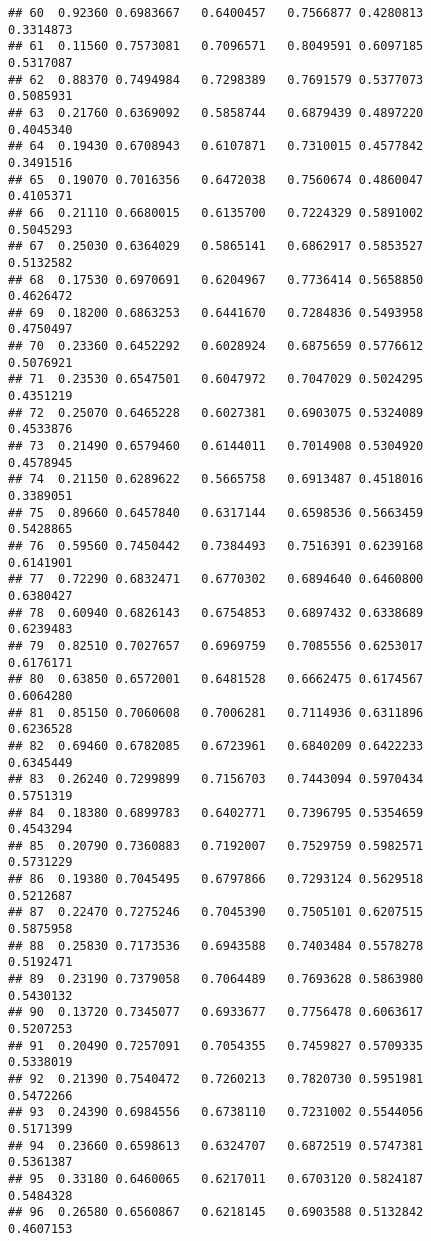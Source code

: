 \documentclass[]{article}
\begin{document}
\begin{verbatim}
## 60  0.92360 0.6983667   0.6400457   0.7566877 0.4280813    0.3314873
## 61  0.11560 0.7573081   0.7096571   0.8049591 0.6097185    0.5317087
## 62  0.88370 0.7494984   0.7298389   0.7691579 0.5377073    0.5085931
## 63  0.21760 0.6369092   0.5858744   0.6879439 0.4897220    0.4045340
## 64  0.19430 0.6708943   0.6107871   0.7310015 0.4577842    0.3491516
## 65  0.19070 0.7016356   0.6472038   0.7560674 0.4860047    0.4105371
## 66  0.21110 0.6680015   0.6135700   0.7224329 0.5891002    0.5045293
## 67  0.25030 0.6364029   0.5865141   0.6862917 0.5853527    0.5132582
## 68  0.17530 0.6970691   0.6204967   0.7736414 0.5658850    0.4626472
## 69  0.18200 0.6863253   0.6441670   0.7284836 0.5493958    0.4750497
## 70  0.23360 0.6452292   0.6028924   0.6875659 0.5776612    0.5076921
## 71  0.23530 0.6547501   0.6047972   0.7047029 0.5024295    0.4351219
## 72  0.25070 0.6465228   0.6027381   0.6903075 0.5324089    0.4533876
## 73  0.21490 0.6579460   0.6144011   0.7014908 0.5304920    0.4578945
## 74  0.21150 0.6289622   0.5665758   0.6913487 0.4518016    0.3389051
## 75  0.89660 0.6457840   0.6317144   0.6598536 0.5663459    0.5428865
## 76  0.59560 0.7450442   0.7384493   0.7516391 0.6239168    0.6141901
## 77  0.72290 0.6832471   0.6770302   0.6894640 0.6460800    0.6380427
## 78  0.60940 0.6826143   0.6754853   0.6897432 0.6338689    0.6239483
## 79  0.82510 0.7027657   0.6969759   0.7085556 0.6253017    0.6176171
## 80  0.63850 0.6572001   0.6481528   0.6662475 0.6174567    0.6064280
## 81  0.85150 0.7060608   0.7006281   0.7114936 0.6311896    0.6236528
## 82  0.69460 0.6782085   0.6723961   0.6840209 0.6422233    0.6345449
## 83  0.26240 0.7299899   0.7156703   0.7443094 0.5970434    0.5751319
## 84  0.18380 0.6899783   0.6402771   0.7396795 0.5354659    0.4543294
## 85  0.20790 0.7360883   0.7192007   0.7529759 0.5982571    0.5731229
## 86  0.19380 0.7045495   0.6797866   0.7293124 0.5629518    0.5212687
## 87  0.22470 0.7275246   0.7045390   0.7505101 0.6207515    0.5875958
## 88  0.25830 0.7173536   0.6943588   0.7403484 0.5578278    0.5192471
## 89  0.23190 0.7379058   0.7064489   0.7693628 0.5863980    0.5430132
## 90  0.13720 0.7345077   0.6933677   0.7756478 0.6063617    0.5207253
## 91  0.20490 0.7257091   0.7054355   0.7459827 0.5709335    0.5338019
## 92  0.21390 0.7540472   0.7260213   0.7820730 0.5951981    0.5472266
## 93  0.24390 0.6984556   0.6738110   0.7231002 0.5544056    0.5171399
## 94  0.23660 0.6598613   0.6324707   0.6872519 0.5747381    0.5361387
## 95  0.33180 0.6460065   0.6217011   0.6703120 0.5824187    0.5484328
## 96  0.26580 0.6560867   0.6218145   0.6903588 0.5132842    0.4607153

\end{verbatim}
\end{document}
